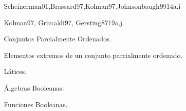 \begin{syllabus}
\begin{unit}{\DSProofTechniquesDef}{}{Scheinerman01,Brassard97,Kolman97,Johnsonbaugh99}{14}{a,i}
   \DSProofTechniquesAllTopics
   \DSProofTechniquesAllObjectives
\end{unit}

\begin{unit}{\ARDigitalLogicAndDataRepresentationDef}{}{Kolman97, Grimaldi97, Gersting87}{19}{a,j}
\begin{topics}
      \item Conjuntos Parcialmente Ordenados.
      \item Elementos extremos de un conjunto parcialmente ordenado.
      \item Látices.
      \item Álgebras Booleanas.
      \item Funciones Booleanas.
      \item \ARDigitalLogicAndDataRepresentationTopicIntroduction
      \item \ARDigitalLogicAndDataRepresentationTopicLogic
   \end{topics}
   \begin{learningoutcomes}
      \item \DSProofTechniquesObjONE
      \item \DSProofTechniquesObjTWO
      \item \DSProofTechniquesObjTHREE
   \end{learningoutcomes}
\end{unit}

\begin{coursebibliography}
\end{coursebibliography}

\end{syllabus}

%
